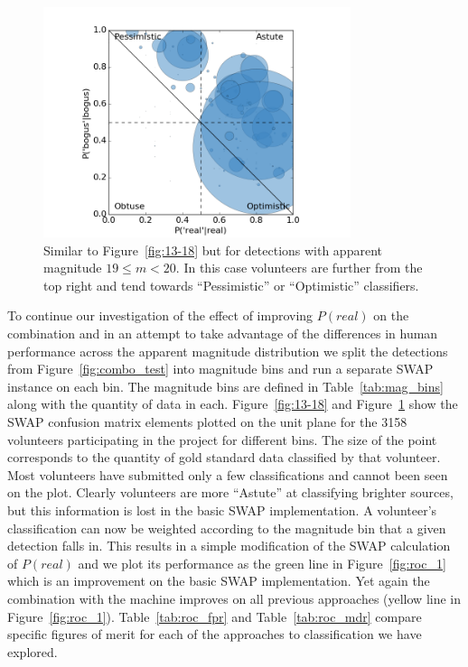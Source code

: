 \documentclass[a4paper,fleqn,usenatbib]{mnras}
\begin{document}
\begin{figure}
   \includegraphics[trim=22mm 2mm 20mm 10mm,clip,width=90mm]{figs/users_meta_swap_20.png}
   \caption{Similar to Figure~\ref{fig:13-18} but for detections with apparent magnitude $19\leq m < 20$.  In this case volunteers are further from the top right and tend towards ``Pessimistic'' or ``Optimistic'' classifiers.}
   \label{fig:20} 
\end{figure}

To continue our investigation of the effect of improving $P(real)$ on the combination and in an attempt to take advantage of the differences in human performance across the apparent magnitude distribution we split the detections from Figure~\ref{fig:combo_test} into magnitude bins and run a separate SWAP instance on each bin.  The magnitude bins are defined in Table~\ref{tab:mag_bins} along with the quantity of data in each.  Figure~\ref{fig:13-18} and Figure~\ref{fig:20} show the SWAP confusion matrix elements plotted on the unit plane for the 3158 volunteers participating in the project for different bins.  The size of the point corresponds to the quantity of gold standard data classified by that volunteer.  Most volunteers have submitted only a few classifications and cannot been seen on the plot.  Clearly volunteers are more ``Astute'' at classifying brighter sources, but this information is lost in the basic SWAP implementation.  A volunteer's classification can now be weighted according to the magnitude bin that a given detection falls in.  This results in a simple modification of the SWAP calculation of $P(real)$ and we plot its performance as the green line in Figure~\ref{fig:roc_1} which is an improvement on the basic SWAP implementation.  Yet again the combination with the machine improves on all previous approaches (yellow line in Figure~\ref{fig:roc_1}).  Table~\ref{tab:roc_fpr} and Table~\ref{tab:roc_mdr} compare specific figures of merit for each of the approaches to classification we have explored.  
\end{document}
